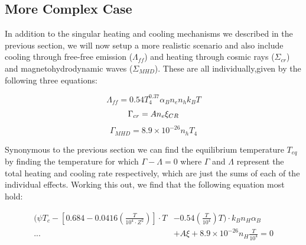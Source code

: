 \subsection{More Complex Case}

In addition to the singular heating and cooling mechanisms we described in the previous section, we will now setup a more realistic scenario and also include cooling through free-free emission ($\Lambda_{ff}$) and heating through cosmic rays ($\Sigma_{cr}$) and magnetohydrodynamic waves ($\Sigma_{MHD}$). These are all individually,given by the following three equations:

\begin{equation}
    \Lambda_{ff} = 0.54 T_4^{0.37}\alpha_Bn_en_hk_BT
\end{equation}
\begin{equation}
    \Gamma_{cr} = An_e\xi_{CR} \\
\end{equation}
\begin{equation}
    \Gamma_{MHD} = 8.9 \times 10^{-26}n_hT_4
\end{equation}

Synonymous to the previous section we can find the equilibrium temperature $T_{eq}$ by finding the temperature for which $\Gamma - \Lambda = 0$ where $\Gamma$ and $\Lambda$ represent the total heating and cooling rate respectively, which are just the sums of each of the individual effects. Working this out, we find that the following equation most hold:

\begin{align}
    \bigg(\psi T_c - \left[0.684 - 0.0416\left(\frac{T}{10^4\cdot Z^2}\right)\right] \cdot T &- 0.54 \left(\frac{T}{10^4}\right) T \bigg)\cdot k_Bn_H\alpha_B\nonumber \\
    ... &+ A\xi + 8.9 \times 10^{-26}n_H\frac{T}{10^4} = 0\label{eq:equi2}
\end{align}
